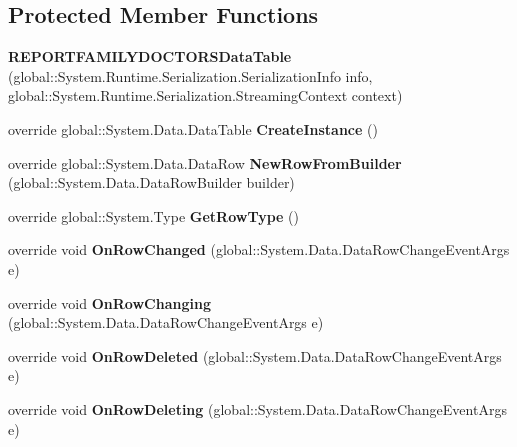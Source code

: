 \subsection*{Protected Member Functions}
\begin{CompactItemize}
\item 
\textbf{REPORTFAMILYDOCTORSDataTable} (global::System.Runtime.Serialization.SerializationInfo info, global::System.Runtime.Serialization.StreamingContext context)\label{class_automatic_medical_system_1_1_data_set1_1_1_r_e_p_o_r_t_f_a_m_i_l_y_d_o_c_t_o_r_s_data_table_e6107dcd60f36f03ff52d60d122c983e}

\item 
override global::System.Data.DataTable \textbf{CreateInstance} ()\label{class_automatic_medical_system_1_1_data_set1_1_1_r_e_p_o_r_t_f_a_m_i_l_y_d_o_c_t_o_r_s_data_table_6586c64f0dbdeb16a97b84bb0528b926}

\item 
override global::System.Data.DataRow \textbf{NewRowFromBuilder} (global::System.Data.DataRowBuilder builder)\label{class_automatic_medical_system_1_1_data_set1_1_1_r_e_p_o_r_t_f_a_m_i_l_y_d_o_c_t_o_r_s_data_table_ae4489bc170a0e436cb8dbeaebee6afc}

\item 
override global::System.Type \textbf{GetRowType} ()\label{class_automatic_medical_system_1_1_data_set1_1_1_r_e_p_o_r_t_f_a_m_i_l_y_d_o_c_t_o_r_s_data_table_6b0573b46d87ce90204152b53616c0c1}

\item 
override void \textbf{OnRowChanged} (global::System.Data.DataRowChangeEventArgs e)\label{class_automatic_medical_system_1_1_data_set1_1_1_r_e_p_o_r_t_f_a_m_i_l_y_d_o_c_t_o_r_s_data_table_b7d5b27d4633588846b228c9b57cc30a}

\item 
override void \textbf{OnRowChanging} (global::System.Data.DataRowChangeEventArgs e)\label{class_automatic_medical_system_1_1_data_set1_1_1_r_e_p_o_r_t_f_a_m_i_l_y_d_o_c_t_o_r_s_data_table_a9cc50bb800e16084b2e8b5dcbcec7e4}

\item 
override void \textbf{OnRowDeleted} (global::System.Data.DataRowChangeEventArgs e)\label{class_automatic_medical_system_1_1_data_set1_1_1_r_e_p_o_r_t_f_a_m_i_l_y_d_o_c_t_o_r_s_data_table_19b8fb351b64336a756ef4fcd8d31559}

\item 
override void \textbf{OnRowDeleting} (global::System.Data.DataRowChangeEventArgs e)\label{class_automatic_medical_system_1_1_data_set1_1_1_r_e_p_o_r_t_f_a_m_i_l_y_d_o_c_t_o_r_s_data_table_e2992e313b652a8e27d65fd3cdcf258a}

\end{CompactItemize}
